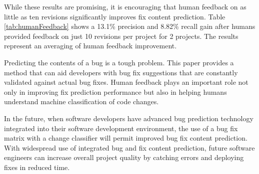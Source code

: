 \documentclass[10pt, conference, letterpaper, compsocconf]{IEEEtran}
\begin{document}
\par While these results are promising, it is encouraging that human feedback on as little as ten revisions significantly improves fix content prediction. Table \ref{tab:humanFeedback} shows a 13.1\% precision and 8.82\% recall gain after
humans provided feedback on just 10 revisions per project for 2 projects. The results represent an averaging of human feedback improvement.

\par Predicting the contents of a bug is a tough problem. This paper provides a method that can aid developers with bug fix suggestions that are constantly validated against actual bug fixes. Human feedback plays an important role
not only in improving fix prediction performance but also in helping humans understand machine classification of code changes.

\par In the future, when software developers have advanced bug prediction technology
integrated into their software development environment, the use of a bug fix matrix with a change classifier will permit improved bug fix content prediction. With
widespread use of integrated bug and fix content prediction, future software engineers can
increase overall project quality by catching errors and deploying fixes in reduced time.





 
\end{document}
